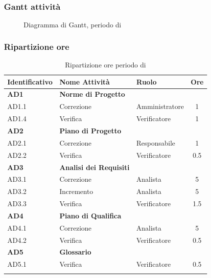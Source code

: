 \subsubsection{Gantt attività}
\begin{figure}[H]
	\centering
	\caption{Diagramma di Gantt, periodo di \AD{}}
\end{figure}

\subsubsection{Ripartizione ore}
\bgroup
\begin{longtable}{|l|l|l|c|}
	\endfirsthead
	\hline
	\textbf{Identificativo} &
	\textbf{Nome Attività} &
	\textbf{Ruolo} &
	\textbf{Ore}\\
	\endhead
	\hline
	\textbf{AD1} & \textbf{Norme di Progetto} &  &  \\
		\hline
		{AD1.1} & {Correzione} & Amministratore  & 1\\
		\hline
		{AD1.4} & {Verifica} & Verificatore & 1 \\
		\hline
	\textbf{AD2} & \textbf{Piano di Progetto}  & & \\
	\hline
		{AD2.1} & {Correzione} & Responsabile &  1\\
		\hline
		{AD2.2} & {Verifica} & Verificatore & 0.5 \\
		\hline
	\textbf{AD3} & \textbf{Analisi dei Requisiti} & &  \\
		\hline
		{AD3.1} & {Correzione} & Analista  &  5\\
		\hline
		{AD3.2} & {Incremento} & Analista  &  5\\
		\hline
		{AD3.3} & {Verifica} & Verificatore  &  1.5\\
		\hline
	\textbf{AD4} & \textbf{Piano di Qualifica} & &  \\
	\hline
		{AD4.1} & {Correzione} & Analista &  5 \\
		\hline
		{AD4.2} & {Verifica} & Verificatore &  0.5 \\
		\hline
	\textbf{AD5} & \textbf{Glossario} & &  \\
	\hline
		{AD5.1} & {Verifica} & Verificatore &  0.5 \\
	\hline
	\caption{Ripartizione ore periodo di \AD{}}
\end{longtable}
\egroup

